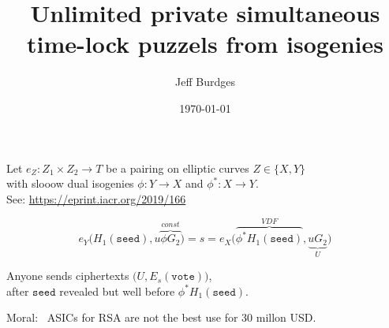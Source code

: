 \documentclass[fleqn,xcolor={usenames,dvipsnames}]{beamer}
\title[http://Web3.Foundation]{Unlimited private simultaneous time-lock puzzels from isogenies}
\institute[W3F]{Web 3 Foundation}
\author[Jeff Burdges]{Jeff Burdges}
\date{\today}
\begin{document}
\begin{frame}%

Let $e_Z : Z_1 \times Z_2 \to T$ be a pairing on elliptic curves $Z \in \{ X, Y \}$ \\ \smallskip
with slooow dual isogenies $\phi : Y \to X$ and $\phi^* : X \to Y$. \\ \smallskip
\hspace*{3pt} {\small See: \url{https://eprint.iacr.org/2019/166}}

\medskip

\def\seed{\mathtt{seed}}

$$
 e_Y \bigl( H_1(\seed), u \overbrace{\phi G_2}^{const} \bigr) 
= s =
 e_X \bigl( \overbrace{\phi^* H_1(\seed)}^{VDF}, \underbrace{u G_2}_{U} \bigr) 
$$ 

\medskip

Anyone sends ciphertexts $\bigl( U,E_s(\mathtt{vote}) \bigr)$,  \\
\hspace*{3pt} after $\seed$ revealed but well before $\phi^* H_1(\seed)$.

\bigskip
\bigskip
\bigskip


Moral: \ ASICs for RSA are not the best use for 30 millon USD.

\end{frame}
\end{document}
